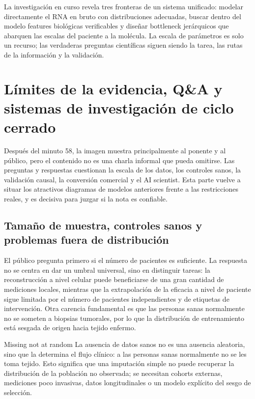 \documentclass[a4paper]{article}
\begin{document}
La investigación en curso revela tres fronteras de un sistema unificado: modelar directamente el RNA en bruto con distribuciones adecuadas, buscar dentro del modelo features biológicas verificables y diseñar bottleneck jerárquicos que abarquen las escalas del paciente a la molécula. La escala de parámetros es solo un recurso; las verdaderas preguntas científicas siguen siendo la tarea, las rutas de la información y la validación.
\section{Límites de la evidencia, Q\&A y sistemas de investigación de ciclo cerrado}

Después del minuto 58, la imagen muestra principalmente al ponente y al público, pero el contenido no es una charla informal que pueda omitirse. Las preguntas y respuestas cuestionan la escala de los datos, los controles sanos, la validación causal, la conversión comercial y el AI scientist. Esta parte vuelve a situar los atractivos diagramas de modelos anteriores frente a las restricciones reales, y es decisiva para juzgar si la nota es confiable.

\subsection{Tamaño de muestra, controles sanos y problemas fuera de distribución}

El público pregunta primero si el número de pacientes es suficiente. La respuesta no se centra en dar un umbral universal, sino en distinguir tareas: la reconstrucción a nivel celular puede beneficiarse de una gran cantidad de mediciones locales, mientras que la extrapolación de la eficacia a nivel de paciente sigue limitada por el número de pacientes independientes y de etiquetas de intervención. Otra carencia fundamental es que las personas sanas normalmente no se someten a biopsias tumorales, por lo que la distribución de entrenamiento está sesgada de origen hacia tejido enfermo.


\begin{warningbox}{Missing not at random}
La ausencia de datos sanos no es una ausencia aleatoria, sino que la determina el flujo clínico: a las personas sanas normalmente no se les toma tejido. Esto significa que una imputación simple no puede recuperar la distribución de la población no observada; se necesitan cohorts externas, mediciones poco invasivas, datos longitudinales o un modelo explícito del sesgo de selección.
\end{warningbox}
\end{document}
